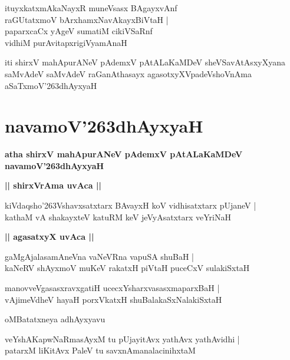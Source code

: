 \documentclass[twoside,12pt,openright]{book}
\def\S{\char'263}
\newcounter{shloka}[chapter]
\def\uvaca#1{\centerline{{\large\textbf{#1}}}}
\begin{document}
\begin{shloka}%
ituyxkatxmAkaNayxR muneVsasx BAgayxvAnf \\
raGUtatxmoV bArxhamxNavAkayxBiVtaH |\\
paparxcaCx yAgeV sumatiM cikiVSaRnf \\
vidhiM purAvitapxrigiVyamAnaH
\end{shloka}

\begin{center}
iti shirxV mahApurANeV pAdemxV pAtALaKaMDeV sheVSavAtAsxyXyana saMvAdeV 
saMvAdeV raGanAthasayx agasotxyXVpadeVshoVnAma  aSaTxmoV\S dhAyxyaH
\end{center}

\chapter{navamoV\S dhAyxyaH}

\begin{center}
{\LARGE\bfseries atha shirxV mahApurANeV pAdemxV pAtALaKaMDeV navamoV\S dhAyxyaH}
\end{center}

\uvaca{|| shirxVrAma uvAca ||}

\begin{shloka}%
kiVdaqsho\S Vshavxsatxtarx BAvayxH koV vidhisatxtarx pUjaneV |\\
kathaM vA shakayxteV katuRM keV jeVyAsatxtarx veYriNaH 
\end{shloka}

\uvaca{|| agasatxyX uvAca ||}

\begin{shloka}%
gaMgAjalasamAneVna vaNeVRna vapuSA shuBaH |\\
kaNeRV shAyxmoV muKeV rakatxH piVtaH puceCxV sulakiSxtaH 
\end{shloka}

\begin{shloka}%
manovveVgasasxravxgatiH ucecxYsharxvasasxmaparxBaH |\\
vAjimeVdheV hayaH porxVkatxH shuBalakaSxNalakiSxtaH 
\end{shloka}

\begin{center}
oMBatatxneya adhAyxyavu
\end{center}

\begin{shloka}%
veYshAKapwNaRmasAyxM tu pUjayitAvx yathAvx yathAvidhi |\\
patarxM liKitAvx PaleV tu savxnAmanalacinihxtaM 
\end{shloka}
\end{document}
